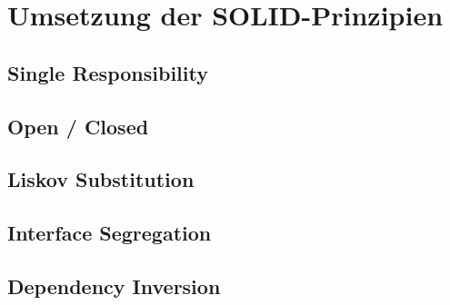 \section{Umsetzung der SOLID-Prinzipien}{
	
	
	\subsection{Single Responsibility}
	
	
	\subsection{Open / Closed}
	
	
	\subsection{Liskov Substitution}
	
	
	\subsection{Interface Segregation}
	
	
	\subsection{Dependency Inversion}
	

}